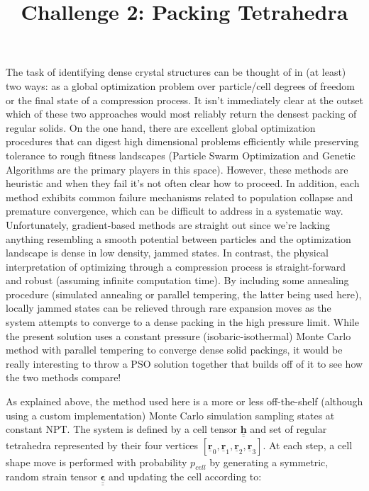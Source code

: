 \documentclass[12pt,a4paper]{article}
\title{Challenge 2: Packing Tetrahedra}
\begin{document}
 
\maketitle

The task of identifying dense crystal structures can be thought of in (at least) two ways: as a global optimization problem over particle/cell degrees of freedom or the final state of a compression process. It isn't immediately clear at the outset which of these two approaches would most reliably return the densest packing of regular solids. On the one hand, there are excellent global optimization procedures that can digest high dimensional problems efficiently while preserving tolerance to rough fitness landscapes (Particle Swarm Optimization and Genetic Algorithms are the primary players in this space). However, these methods are heuristic and when they fail it's not often clear how to proceed. In addition, each method exhibits common failure mechanisms related to population collapse and premature convergence, which can be difficult to address in a systematic way. Unfortunately, gradient-based methods are straight out since we're lacking anything resembling a smooth potential between particles and the optimization landscape is dense in low density, jammed states. In contrast, the physical interpretation of optimizing through a compression process is straight-forward and robust (assuming infinite computation time). By including some annealing procedure (simulated annealing or parallel tempering, the latter being used here), locally jammed states can be relieved through rare expansion moves as the system attempts to converge to a dense packing in the high pressure limit. While the present solution uses a constant pressure (isobaric-isothermal) Monte Carlo method with parallel tempering to converge dense solid packings, it would be really interesting to throw a PSO solution together that builds off of it to see how the two methods compare!

As explained above, the method used here is a more or less off-the-shelf (although using a custom implementation) Monte Carlo  simulation sampling states at constant NPT. The system is defined by a cell tensor $\underline{\underline{\mathbf{h}}}$ and set of regular tetrahedra represented by their four vertices $[\underline{\mathbf{r}}_0,\underline{\mathbf{r}}_1,\underline{\mathbf{r}}_2,\underline{\mathbf{r}}_3]$. At each step, a cell shape move is performed with probability $p_{cell}$ by generating a symmetric, random strain tensor $\underline{\underline{\mathbf{\epsilon}}}$ and updating the cell according to:
\end{document}
